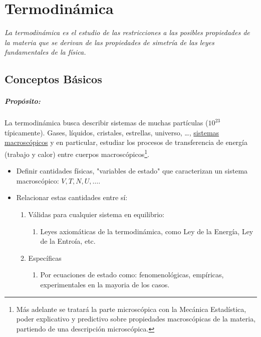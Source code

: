 \chapter{Termodinámica}

\textit{La termodinámica es el estudio de las restricciones a las posibles propiedades de la materia que se derivan de las propiedades de simetría de las leyes fundamentales de la física.}

\section{Conceptos Básicos}

\paragraph{Propósito: } La termodinámica busca describir sistemas de muchas partículas ($10^{23}$ típicamente). Gases, líquidos, cristales, estrellas, universo, \ldots ,  \underline{sistemas macroscópicos} y en particular, estudiar los procesos de transferencia de energía (trabajo y calor) entre cuerpos macroscópicos\footnote{Más adelante se tratará la parte microscópica con la Mecánica Estadística, poder explicativo y predictivo sobre propiedades macroscópicas de la materia, partiendo de una descripción microscópica.}. 

\begin{itemize}
	\item Definir cantidades físicas, "variables de estado" que caracterizan un sistema macroscópico: $V,T,N,U,\ldots$.
	\item Relacionar estas cantidades entre sí:
		\begin{enumerate}
			\item Válidas para cualquier sistema en equilibrio:
			\begin{enumerate}
				\item Leyes axiomáticas de la termodinámica, como Ley de la Energía, Ley de la Entroía, etc.
			\end{enumerate}
			\item Específicas
			\begin{enumerate}
				\item Por ecuaciones de estado como: fenomenológicas, empíricas, experimentales en la mayoria de los casos.
			\end{enumerate}
		\end{enumerate}
\end{itemize}


